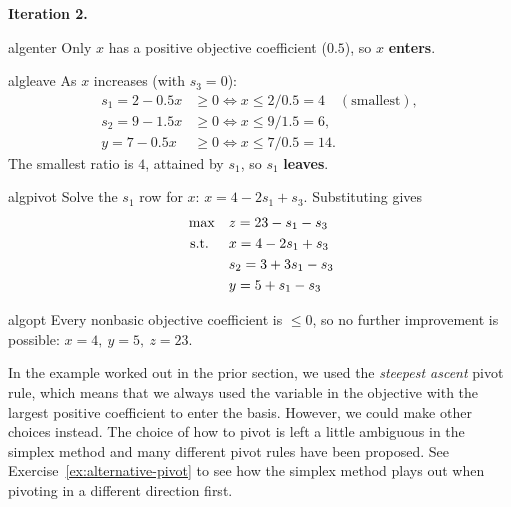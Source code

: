 \noindent\textbf{Iteration 2.}
\begin{steppanel}{algenter}
 Only \(x\) has a positive objective coefficient (\(0.5\)), so \(x\) \textbf{enters}.
\end{steppanel}
\begin{steppanel}{algleave}
 As \(x\) increases (with \(s_3=0\)):
\[
\begin{aligned}
s_1 = 2 - 0.5x &\ge 0 \iff x \le 2/0.5 = 4 \quad(\text{smallest}),\\
s_2 = 9 - 1.5x &\ge 0 \iff x \le 9/1.5 = 6,\\
y   = 7 - 0.5x &\ge 0 \iff x \le 7/0.5 = 14.
\end{aligned}
\]
The smallest ratio is \(4\), attained by \(s_1\), so \(s_1\) \textbf{leaves}.
\end{steppanel}
\begin{steppanel}{algpivot}
 Solve the \(s_1\) row for \(x\): \(x = 4 - 2s_1 + s_3\). Substituting gives
\[
\begin{aligned}
\max\quad & z = 23 - s_1 - s_3 \\
\mbox{ s.t. }\quad  & x = 4 - 2s_1 + s_3 \\
          & s_2 = 3 + 3s_1 - s_3 \\
          & y = 5 + s_1 - s_3
\end{aligned}
\]
\end{steppanel}
\begin{steppanel}{algopt}
 Every nonbasic objective coefficient is \(\le 0\), so no further improvement is possible: \(x=4,\ y=5,\ z=23\).
\end{steppanel}
%
%

In the example worked out in the prior section, we used the \emph{steepest ascent} pivot rule, which means that we always used the variable in the objective with the largest positive coefficient to enter the basis.  However, we could make other choices instead.  The choice of how to pivot is left a little ambiguous in the simplex method and many different pivot rules have been proposed.
See Exercise~\ref{ex:alternative-pivot} to see how the simplex method plays out when pivoting in a different direction first.  

